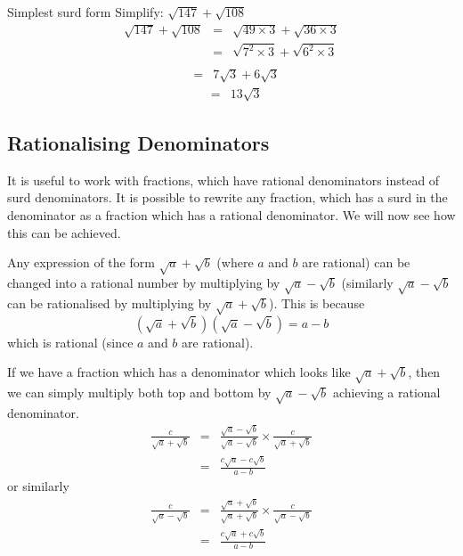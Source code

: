 \begin{wex}{Simplest surd form}
{Simplify: $\sqrt{147} + \sqrt{108}$}{
\begin{eqnarray*}
\sqrt{147} + \sqrt{108} &=& \sqrt{49\times 3} + \sqrt{36\times 3}\\
&=& \sqrt{7^{2}\times 3} + \sqrt{6^{2}\times 3}\\
\end{eqnarray*}
\begin{eqnarray*}
&=& 7\sqrt{3} + 6\sqrt{3}
\end{eqnarray*}
\begin{eqnarray*}
&=& 13\sqrt{3}
\end{eqnarray*}
}
\end{wex}

\subsection{Rationalising Denominators}
It is useful to work with fractions, which have rational denominators instead of surd denominators. It is possible to rewrite any fraction, which has a surd in the denominator as a fraction which has a rational denominator. We will now see how this can be achieved.

Any expression of the form $\sqrt{a}+\sqrt{b}$ (where $a$ and $b$ are rational)
can be changed into a rational number by multiplying by $\sqrt{a}-\sqrt{b}$
(similarly $\sqrt{a}-\sqrt{b}$ can be rationalised by multiplying by
$\sqrt{a}+\sqrt{b}$). This is because
\begin{equation}
\label{eq:mn:s:rat}
(\sqrt{a}+\sqrt{b})(\sqrt{a}-\sqrt{b})=a-b
\end{equation}
which is rational (since $a$ and $b$ are rational).

If we have a fraction which has a denominator which looks like
$\sqrt{a}+\sqrt{b}$, then we can simply multiply both top and bottom by
$\sqrt{a}-\sqrt{b}$ achieving a rational denominator.
\begin{eqnarray}
\label{eq:mn:s:rat:frac1}
\frac{c}{\sqrt a+\sqrt b}&=&\frac{\sqrt{a}-\sqrt{b}}{\sqrt{a}-\sqrt{b}}
\times\frac{c}{\sqrt a+\sqrt b}\\\nonumber
&=&\frac{c\sqrt{a}-c\sqrt{b}}{a-b}
\end{eqnarray}
or similarly
\begin{eqnarray}
\label{eq:mn:s:rat:frac2}
\frac{c}{\sqrt a-\sqrt b}&=&\frac{\sqrt{a}+\sqrt{b}}{\sqrt{a}+\sqrt{b}}
\times\frac{c}{\sqrt a-\sqrt b}\\\nonumber
&=&\frac{c\sqrt{a}+c\sqrt{b}}{a-b}
\end{eqnarray}

